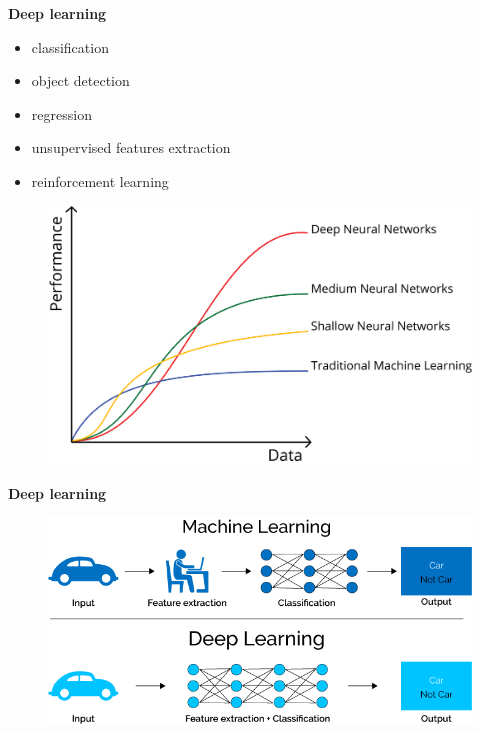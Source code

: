 \documentclass[xcolor=dvipsnames]{beamer}
\begin{document}
\begin{frame}{\bf Deep learning \footnotemark}

\begin{itemize}
  \item classification
  \item object detection
  \item regression
  \item unsupervised features extraction
  \item reinforcement learning
\end{itemize}


\begin{figure}
\includegraphics[scale=0.1]{../../pictures/dl_vs_ml.png}
\end{figure}



\end{frame}


\begin{frame}{\bf Deep learning}

  \begin{figure}
    \includegraphics[scale=0.4]{../../pictures/end_to_end_learning.png}
  \end{figure}

\end{frame}
\end{document}
